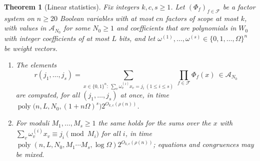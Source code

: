 \documentclass[11pt,reqno]{amsart}
\numberwithin{equation}{section}
\theoremstyle{plain}
\newtheorem{theorem}{Theorem}[section]
\theoremstyle{definition}
\theoremstyle{remark}
\DeclareMathOperator{\poly}{poly}
\newcommand{\A}{\mathcal{A}}
\newcommand{\F}{\mathcal{F}}
\newcommand{\rhon}{\rho}
\begin{document}
\begin{theorem}[Linear statistics]\label{thm:linear}
Fix integers $k,c,s\ge1$. Let $(\Phi_f)_{f\in\F}$ be a factor system on $n\ge20$
Boolean variables with at most $cn$ factors of scope at most $k$, with values in
$\A_{N_0}$ for some $N_0\ge1$ and coefficients that are polynomials in $W_0$ with
integer coefficients of at most $L$ bits, and let
$\omega^{(1)},\dots,\omega^{(s)}\in\{0,1,\dots,\Omega\}^n$ be weight vectors.
\begin{enumerate}[label=\textup{(\roman*)},leftmargin=2.2em]
\item\label{it:lineq} The elements
\[
  r(j_1,\dots,j_s)=\sum_{x\in\{0,1\}^n:\ \sum_v\omega^{(i)}_vx_v=j_i\ (1\le i\le s)}
  \ \prod_{f\in\F}\Phi_f(x)\ \in\A_{N_0}
\]
are computed, for all $(j_1,\dots,j_s)$ at once, in time
$\poly\bigl(n,L,N_0,(1+n\Omega)^s\bigr)2^{O_{k,c}(\rhon(n))}$.
\item\label{it:lincong} For moduli $M_1,\dots,M_s\ge1$ the same holds for the
sums over the $x$ with $\sum_v\omega^{(i)}_vx_v\equiv j_i\pmod{M_i}$ for all $i$,
in time $\poly(n,L,N_0,M_1\cdots M_s,\log\Omega)2^{O_{k,c}(\rhon(n))}$; equations
and congruences may be mixed.
\end{enumerate}
\end{theorem}
\end{document}
